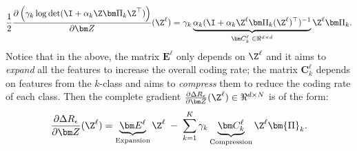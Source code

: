 \documentclass[../../book-main.tex]{subfiles}
\begin{document}
\begin{equation}\label{eqn:compress-directions}
\frac{1}{2}\frac{\partial \left( \gamma_{k}  \log \det (\I + \alpha_{k} \Z \bm \Pi_k \Z^{\top} )  \right)}{\partial \bm Z}(\Z^\ell) = \gamma_{k}  \underbrace{ \alpha_{k}  (\I +  \alpha_{k} \Z^\ell \bm \Pi_k (\Z^\ell)^{\top})^{-1}}_{\bm C^{\ell}_k \; \in \Re^{d\times d}} \Z^{\ell} \bm \Pi_k.
\end{equation}
Notice that in the above, the matrix $\bm E^{\ell}$  only depends on $\Z^{\ell}$ and it aims to {\em expand} all the features to increase the overall coding rate; the matrix $\bm C^{\ell}_{k}$ depends on features from the $k$-class and aims to {\em compress} them to reduce the coding rate of each class. 
Then the complete gradient $\frac{\partial \Delta R_{\epsilon}}{\partial \bm Z}(\Z^\ell) \in \Re^{d\times N}$ is of the  form:
\begin{equation}
\frac{\partial \Delta R_{\epsilon}}{\partial \bm Z}(\Z^\ell)  = \underbrace{\bm E^{\ell}}_{\text{Expansion}} \Z^{\ell} \;-\; \sum_{k=1}^K \gamma_{k} \underbrace{\bm C_{k}^{\ell}}_{\text{Compression}}  \Z^{\ell} \bm{\Pi}_k.
\label{eqn:DR-gradient}
\end{equation}
\end{document}
